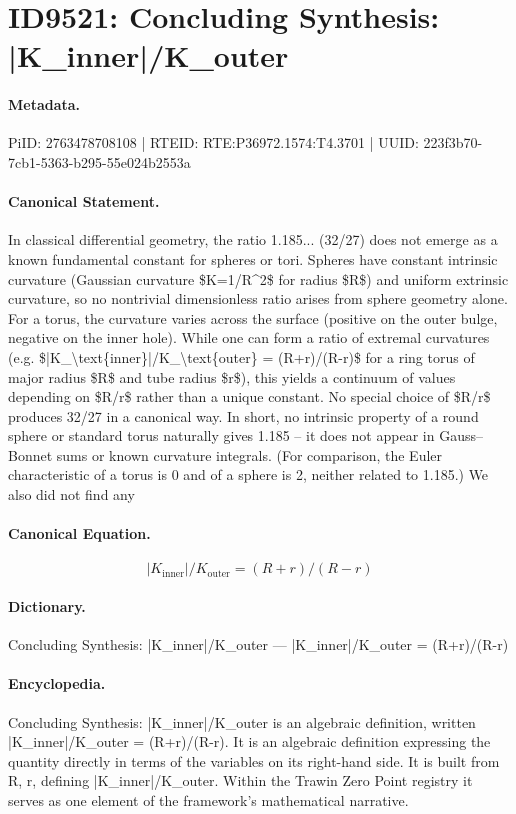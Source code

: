 \section*{ID9521: Concluding Synthesis: |K\_inner|/K\_outer}
\paragraph{Metadata.}
PiID: 2763478708108 | RTEID: RTE:P36972.1574:T4.3701 | UUID: 223f3b70-7cb1-5363-b295-55e024b2553a

\paragraph{Canonical Statement.}
In classical differential geometry, the ratio 1.185... (32/27) does not emerge as a known fundamental constant for spheres or tori. Spheres have constant intrinsic curvature (Gaussian curvature \$K=1/R\textasciicircum{}2\$ for radius \$R\$) and uniform extrinsic curvature, so no nontrivial dimensionless ratio arises from sphere geometry alone. For a torus, the curvature varies across the surface (positive on the outer bulge, negative on the inner hole). While one can form a ratio of extremal curvatures (e.g. \$|K\_\textbackslash{}text\{inner\}|/K\_\textbackslash{}text\{outer\} = (R+r)/(R-r)\$ for a ring torus of major radius \$R\$ and tube radius \$r\$), this yields a continuum of values depending on \$R/r\$ rather than a unique constant. No special choice of \$R/r\$ produces 32/27 in a canonical way. In short, no intrinsic property of a round sphere or standard torus naturally gives 1.185 – it does not appear in Gauss–Bonnet sums or known curvature integrals. (For comparison, the Euler characteristic of a torus is 0 and of a sphere is 2, neither related to 1.185.) We also did not find any

\paragraph{Canonical Equation.}
\[
|K_\text{inner}|/K_\text{outer} = (R+r)/(R-r)
\]

\paragraph{Dictionary.}
Concluding Synthesis: |K\_inner|/K\_outer — |K\_inner|/K\_outer = (R+r)/(R-r)

\paragraph{Encyclopedia.}
Concluding Synthesis: |K\_inner|/K\_outer is an algebraic definition, written |K\_inner|/K\_outer = (R+r)/(R-r). It is an algebraic definition expressing the quantity directly in terms of the variables on its right-hand side. It is built from R, r, defining |K\_inner|/K\_outer. Within the Trawin Zero Point registry it serves as one element of the framework's mathematical narrative.
